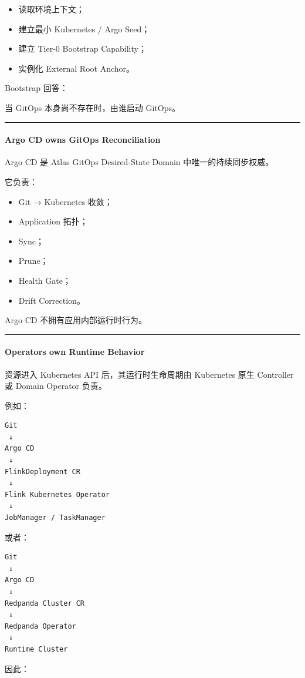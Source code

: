\documentclass[11pt,a4paper]{article}
\begin{document}
\begin{itemize}
  \item 读取环境上下文；
  \item 建立最小 Kubernetes / Argo Seed；
  \item 建立 Tier-0 Bootstrap Capability；
  \item 实例化 External Root Anchor。
\end{itemize}
Bootstrap 回答：

\begin{gfmBlockquote}
当 GitOps 本身尚不存在时，由谁启动 GitOps。
\end{gfmBlockquote}
\vspace{0.5em}\hrule\vspace{0.5em}
\paragraph{Argo CD owns GitOps Reconciliation}
Argo CD 是 Atlas GitOps Desired-State Domain 中唯一的持续同步权威。

它负责：

\begin{itemize}
  \item Git → Kubernetes 收敛；
  \item Application 拓扑；
  \item Sync；
  \item Prune；
  \item Health Gate；
  \item Drift Correction。
\end{itemize}
Argo CD 不拥有应用内部运行时行为。

\vspace{0.5em}\hrule\vspace{0.5em}
\paragraph{Operators own Runtime Behavior}
资源进入 Kubernetes API 后，其运行时生命周期由 Kubernetes 原生 Controller 或 Domain Operator 负责。

例如：

\begin{lstlisting}[language=text]
Git
 ↓
Argo CD
 ↓
FlinkDeployment CR
 ↓
Flink Kubernetes Operator
 ↓
JobManager / TaskManager
\end{lstlisting}
或者：

\begin{lstlisting}[language=text]
Git
 ↓
Argo CD
 ↓
Redpanda Cluster CR
 ↓
Redpanda Operator
 ↓
Runtime Cluster
\end{lstlisting}
因此：
\end{document}

